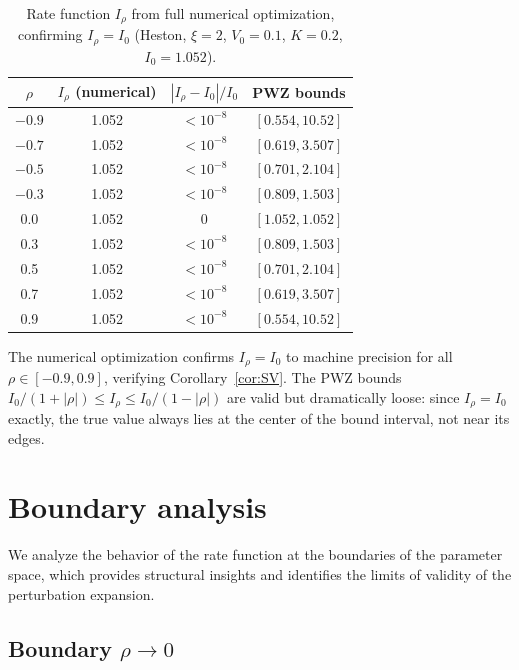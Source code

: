 \documentclass[11pt]{article}
\theoremstyle{definition}
\begin{document}
\begin{table}[h]
\centering
\caption{Rate function $I_\rho$ from full numerical optimization, confirming $I_\rho = I_0$ (Heston, $\xi = 2$, $V_0 = 0.1$, $K = 0.2$, $I_0 = 1.052$).}\label{tab:full_comparison}
\begin{tabular}{c|cc|c}
\hline
$\rho$ & $I_\rho$ (numerical) & $|I_\rho - I_0|/I_0$ & PWZ bounds \\
\hline
$-0.9$ & 1.052 & $< 10^{-8}$ & $[0.554, 10.52]$ \\
$-0.7$ & 1.052 & $< 10^{-8}$ & $[0.619, 3.507]$ \\
$-0.5$ & 1.052 & $< 10^{-8}$ & $[0.701, 2.104]$ \\
$-0.3$ & 1.052 & $< 10^{-8}$ & $[0.809, 1.503]$ \\
0.0 & 1.052 & $0$ & $[1.052, 1.052]$ \\
0.3 & 1.052 & $< 10^{-8}$ & $[0.809, 1.503]$ \\
0.5 & 1.052 & $< 10^{-8}$ & $[0.701, 2.104]$ \\
0.7 & 1.052 & $< 10^{-8}$ & $[0.619, 3.507]$ \\
0.9 & 1.052 & $< 10^{-8}$ & $[0.554, 10.52]$ \\
\hline
\end{tabular}
\end{table}

The numerical optimization confirms $I_\rho = I_0$ to machine precision for all $\rho \in [-0.9, 0.9]$, verifying Corollary~\ref{cor:SV}. The PWZ bounds $I_0/(1+|\rho|) \leq I_\rho \leq I_0/(1-|\rho|)$ are valid but dramatically loose: since $I_\rho = I_0$ exactly, the true value always lies at the center of the bound interval, not near its edges.

\section{Boundary analysis}\label{sec:boundary}

We analyze the behavior of the rate function at the boundaries of the parameter space, which provides structural insights and identifies the limits of validity of the perturbation expansion.

\subsection{Boundary $\rho \to 0$}\label{sec:rho_to_0}
\end{document}
